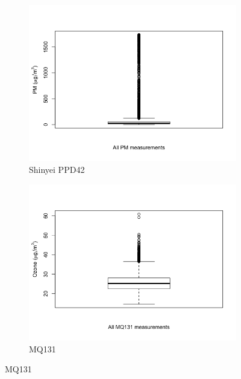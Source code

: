 \documentclass[11pt]{report}
\begin{document}
\begin{figure}[!tb]
    \centering
    \begin{minipage}{1\linewidth}
            \begin{subfigure}[t]{.5\linewidth}
                \includegraphics[width=\textwidth]{images/pm_boxplot}
                \caption{Shinyei PPD42}
                \label{fig:pm_boxplot}
            \end{subfigure}
            \begin{subfigure}[t]{.5\linewidth}
            	\includegraphics[width=\textwidth]{images/ozone_boxplot}
            	\caption{MQ131}
            	\label{fig:mq131_boxplot}
	   \end{subfigure}

\end{minipage}
\end{figure}
\end{document}

